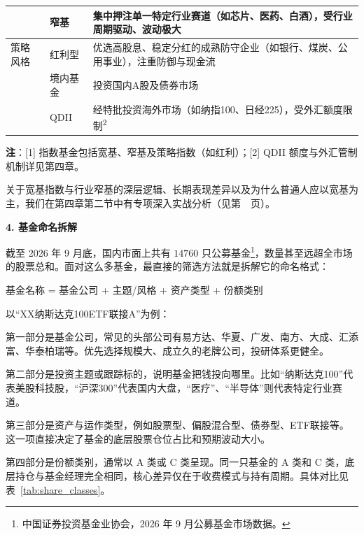\documentclass[12pt,openany]{book}
\newcommand{\subhead}[1]{%
    \par\vspace{0.5\baselineskip}%
    \noindent\textbf{#1}\par%
    \vspace{0.5\baselineskip}%
}
\begin{document}
\begin{table}[tbp]
\begin{tabularx}{\linewidth}{|>{\centering\arraybackslash\hsize=0.55\hsize}X|>{\centering\arraybackslash\hsize=0.55\hsize}X|>{\centering\arraybackslash\hsize=1.9\hsize}X|}
                         & 窄基 & 集中押注单一特定行业赛道（如芯片、医药、白酒），受行业周期驱动、波动极大 \\ \hline
策略风格                 & 红利型 & 优选高股息、稳定分红的成熟防守企业（如银行、煤炭、公用事业），注重防御与现金流 \\ \hline
\multirow{2}{*}{投资地域} & 境内基金 & 投资国内A股及债券市场 \\ \cline{2-3} 
                         & QDII & 经特批投资海外市场（如纳指100、日经225），受外汇额度限制\textsuperscript{2} \\ \hline
\end{tabularx}
\par\vspace{2pt}
{\footnotesize\singlespacing\noindent\raggedright
\textbf{注}：[1] 指数基金包括宽基、窄基及策略指数（如红利）；[2] QDII 额度与外汇管制机制详见第四章。\par}
\end{table}

关于宽基指数与行业窄基的深层逻辑、长期表现差异以及为什么普通人应以宽基为主，我们在第四章第二节中有专项深入实战分析（见第~\pageref{sec:broad_based_funds}~页）。

\newpage

\subhead{4. 基金命名拆解}

截至 2026 年 9 月底，国内市面上共有 $14760$ 只公募基金\footnote{中国证券投资基金业协会，2026 年 9 月公募基金市场数据。}，数量甚至远超全市场的股票总和。面对这么多基金，最直接的筛选方法就是拆解它的命名格式：

\begin{center}
基金名称 = 基金公司 + 主题/风格 + 资产类型 + 份额类别
\end{center}

以“XX纳斯达克100ETF联接A”为例：

第一部分是基金公司，常见的头部公司有易方达、华夏、广发、南方、大成、汇添富、华泰柏瑞等。优先选择规模大、成立久的老牌公司，投研体系更健全。

第二部分是投资主题或跟踪标的，说明基金把钱投向哪里。比如“纳斯达克100”代表美股科技股，“沪深300”代表国内大盘，“医疗”、“半导体”则代表特定行业赛道。

第三部分是资产与运作类型，例如股票型、偏股混合型、债券型、ETF联接等。这一项直接决定了基金的底层股票仓位占比和预期波动大小。

第四部分是份额类别，通常以 A 类或 C 类呈现。同一只基金的 A 类和 C 类，底层持仓与基金经理完全相同，核心差异仅在于收费模式与持有周期。具体对比见表~\ref{tab:share_classes}。
\end{document}
